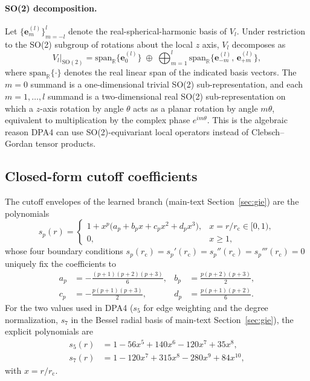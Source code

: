 \paragraph{SO(2) decomposition.}
Let $\{\mathbf{e}^{(l)}_m\}_{m=-l}^{l}$ denote the real-spherical-harmonic basis of $V_l$.
Under restriction to the SO(2) subgroup of rotations about
the local $z$ axis, $V_l$ decomposes as
\begin{equation}
    V_l|_{\mathrm{SO}(2)} = \mathrm{span}_{\mathbb{R}}\{\mathbf{e}^{(l)}_0\} \;\oplus\; \bigoplus_{m=1}^{l} \mathrm{span}_{\mathbb{R}}\{\mathbf{e}^{(l)}_{-m},\,\mathbf{e}^{(l)}_{+m}\}, \label{eq:sm-so2-decomposition} \end{equation} where $\mathrm{span}_{\mathbb{R}}\{\cdot\}$ denotes the real linear span of the indicated basis vectors.
The $m=0$ summand is a one-dimensional trivial SO(2) sub-representation, and each $m=1,\ldots,l$ summand is a two-dimensional real SO(2) sub-representation on which a $z$-axis rotation by angle $\theta$ acts as a planar rotation by angle $m\theta$, equivalent to multiplication by the complex phase $e^{im\theta}$.
This is the algebraic reason DPA4 can use SO(2)-equivariant local operators instead of Clebsch--Gordan tensor products.

\subsection{Closed-form cutoff coefficients}
\label{sec:sm-radial}

The cutoff envelopes of the learned branch (main-text Section~\ref{sec:gie}) are the polynomials
\begin{equation}
    s_p(r) =
    \begin{cases}
        1+x^p\bigl(a_p+b_p x+c_p x^2+d_p x^3\bigr), & x=r/r_{\mathrm{c}}\in[0,1), \\
        0,                                          & x\ge 1,
    \end{cases}
    \label{eq:sm-envelope}
\end{equation}
whose four boundary conditions
$s_p(r_{\mathrm{c}})=s_p'(r_{\mathrm{c}})=s_p''(r_{\mathrm{c}})=s_p'''(r_{\mathrm{c}})=0$
uniquely fix the coefficients to
\begin{align}
    a_p & =-\frac{(p+1)(p+2)(p+3)}{6}, &
    b_p & =\frac{p(p+2)(p+3)}{2},        \\
    c_p & =-\frac{p(p+1)(p+3)}{2},     &
    d_p & =\frac{p(p+1)(p+2)}{6}.
    \label{eq:sm-cutoff-coefficients}
\end{align}
For the two values used in DPA4 ($s_5$ for edge weighting and the degree
normalization, $s_7$ in the Bessel radial basis of main-text
Section~\ref{sec:gie}), the explicit polynomials are
\begin{align}
    s_5(r) & =1-56x^5+140x^6-120x^7+35x^8,       \\
    s_7(r) & =1-120x^7+315x^8-280x^9+84x^{10},
\end{align}
with $x=r/r_{\mathrm{c}}$.

